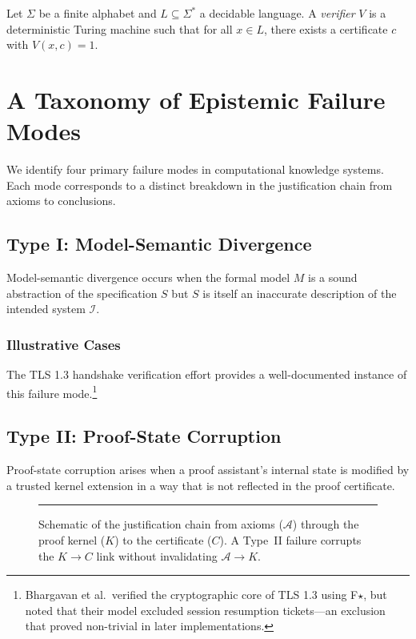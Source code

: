 \documentclass[twocolumn,12pt]{article}
\begin{document}
Let $\Sigma$ be a finite alphabet and $L \subseteq \Sigma^*$ a decidable language.
A \emph{verifier} $V$ is a deterministic Turing machine such that for all
$x \in L$, there exists a certificate $c$ with $V(x,c) = 1$.
\lipsum[4]

\section{A Taxonomy of Epistemic Failure Modes}
\label{sec:taxonomy}

We identify four primary failure modes in computational knowledge systems.
Each mode corresponds to a distinct breakdown in the justification chain
from axioms to conclusions.

\subsection{Type I: Model-Semantic Divergence}
\label{sec:type1}

Model-semantic divergence occurs when the formal model $M$ is a sound
abstraction of the specification $S$ but $S$ is itself an inaccurate
description of the intended system $\mathcal{I}$.
\lipsum[5]

\subsubsection{Illustrative Cases}

The TLS 1.3 handshake verification effort \cite{bhargavan2017} provides
a well-documented instance of this failure mode.\footnote{Bhargavan et
al.\ verified the cryptographic core of TLS 1.3 using F$\star$, but noted
that their model excluded session resumption tickets—an exclusion that
proved non-trivial in later implementations.}
\lipsum[6]

\subsection{Type II: Proof-State Corruption}
\label{sec:type2}

Proof-state corruption arises when a proof assistant's internal state is
modified by a trusted kernel extension in a way that is not reflected in
the proof certificate.
\lipsum[7]

\begin{figure}[h]
  \centering
  \rule{0.9\columnwidth}{3cm}
  \caption{Schematic of the justification chain from axioms ($\mathcal{A}$)
  through the proof kernel ($K$) to the certificate ($C$). A Type~II failure
  corrupts the $K \to C$ link without invalidating $\mathcal{A} \to K$.}
  \label{fig:justification-chain}
\end{figure}
\end{document}
